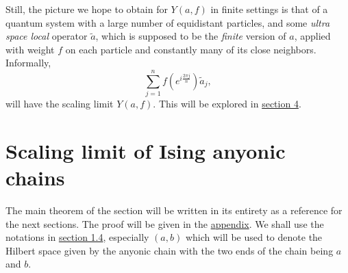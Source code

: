 \documentclass[twoside,11pt,titlepage]{amsart}
\renewcommand{\=}[1]{\stackrel{#1}{=}} %
\theoremstyle{definition}
\theoremstyle{remark}
\begin{document}
Still, the picture we hope to obtain for $Y(a,f)$ in finite settings is that of a quantum system with a large number of equidistant particles, and some \textit{ultra space local} operator $\widetilde{a}$, which is supposed to be the \textit{finite} version of $a$, applied with weight $f$ on each particle and constantly many of its close neighbors. Informally,
$$\sum_{j=1}^n f(e^{i\frac{2\pi j}{n}})\widetilde{a}_j,$$
will have the scaling limit $Y(a,f)$. This will be explored in \hyperref[4]{section 4}.

\section{Scaling limit of Ising anyonic chains}\label{3}

The main theorem of the section will be written in its entirety as a reference for the next sections. The proof will be given in the \hyperref[A.1]{appendix}. We shall use the notations in \hyperref[1.4]{section 1.4}, especially $(a,b)$ which will be used to denote the Hilbert space given by the anyonic chain with the two ends of the chain being $a$ and $b$.
\end{document}
